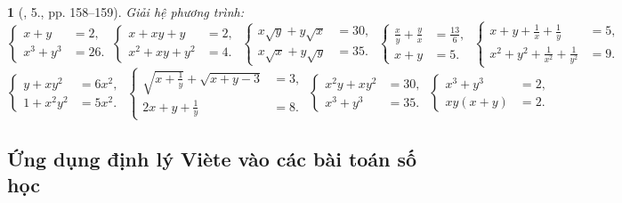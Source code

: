 \documentclass{article}
\newtheorem{baitoan}{}
\begin{document}
\begin{baitoan}[\cite{Thu_Viet_Minh_ptb2}, 5., pp. 158--159]
	Giải hệ phương trình:
	\begin{equation*}
		\left\{\begin{split}
			x + y &= 2,\\
			x^3 + y^3 &= 26.
		\end{split}\right.\ \left\{\begin{split}
			x + xy + y &= 2,\\
			x^2 + xy + y^2 &= 4.
		\end{split}\right.\ \left\{\begin{split}
			x\sqrt{y} + y\sqrt{x} &= 30,\\
			x\sqrt{x} + y\sqrt{y} &= 35.
		\end{split}\right.\ \left\{\begin{split}
			\frac{x}{y} + \frac{y}{x} &= \frac{13}{6},\\
			x + y &= 5.
		\end{split}\right.\ \left\{\begin{split}
			x + y + \frac{1}{x} + \frac{1}{y} &= 5,\\
			x^2 + y^2 + \frac{1}{x^2} + \frac{1}{y^2} &= 9.
		\end{split}\right.
	\end{equation*}
	\begin{equation*}
		\left\{\begin{split}
			y + xy^2 &= 6x^2,\\
			1 + x^2y^2 &= 5x^2.
		\end{split}\right.\ \left\{\begin{split}
			\sqrt{x + \frac{1}{y}} + \sqrt{x + y - 3} &= 3,\\
			2x + y + \frac{1}{y} &= 8.
		\end{split}\right.\ \left\{\begin{split}
			x^2y + xy^2 &= 30,\\
			x^3 + y^3 &= 35.
		\end{split}\right.\ \left\{\begin{split}
			x^3 + y^3 &= 2,\\
			xy(x + y) &= 2.
		\end{split}\right.
	\end{equation*}
\end{baitoan}

\subsection{Ứng dụng định lý Vi\`ete vào các bài toán số học}
\end{document}
